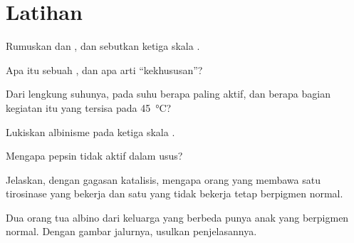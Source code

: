 \section{Latihan}

\begin{exercise}[$\star$]\label{exo:g11:enzymes-and-phenotype:1}
Rumuskan  dan , dan sebutkan ketiga skala .
\end{exercise}

\begin{exercise}[$\star$]\label{exo:g11:enzymes-and-phenotype:2}
Apa itu  sebuah , dan apa arti ``kekhususan''?
\end{exercise}

\begin{exercise}[$\star$]\label{exo:g11:enzymes-and-phenotype:3}
Dari lengkung suhunya, pada suhu berapa  paling aktif, dan
berapa bagian kegiatan itu yang tersisa pada \qty{45}{\celsius}?
\end{exercise}

\begin{exercise}[$\star$]\label{exo:g11:enzymes-and-phenotype:4}
Lukiskan albinisme pada ketiga skala .
\end{exercise}

\begin{exercise}[$\star$]\label{exo:g11:enzymes-and-phenotype:5}
Mengapa pepsin tidak aktif dalam usus?
\end{exercise}

\begin{exercise}[$\star\star$]\label{exo:g11:enzymes-and-phenotype:6}
Jelaskan, dengan gagasan katalisis, mengapa orang yang membawa satu
  tirosinase yang bekerja dan satu yang tidak bekerja tetap
berpigmen normal.
\end{exercise}

\begin{exercise}[$\star\star$]\label{exo:g11:enzymes-and-phenotype:7}
Dua orang tua albino dari keluarga yang berbeda punya anak yang
berpigmen normal. Dengan gambar jalurnya, usulkan penjelasannya.
\end{exercise}

